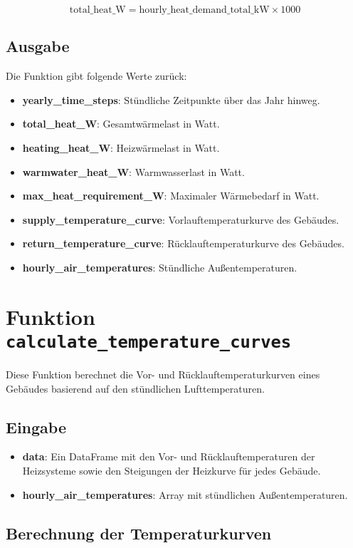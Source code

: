 \documentclass[a4paper,12pt]{article}
\begin{document}
\[
\text{total\_heat\_W} = \text{hourly\_heat\_demand\_total\_kW} \times 1000
\]

\subsection{Ausgabe}
Die Funktion gibt folgende Werte zurück:
\begin{itemize}
    \item \textbf{yearly\_time\_steps}: Stündliche Zeitpunkte über das Jahr hinweg.
    \item \textbf{total\_heat\_W}: Gesamtwärmelast in Watt.
    \item \textbf{heating\_heat\_W}: Heizwärmelast in Watt.
    \item \textbf{warmwater\_heat\_W}: Warmwasserlast in Watt.
    \item \textbf{max\_heat\_requirement\_W}: Maximaler Wärmebedarf in Watt.
    \item \textbf{supply\_temperature\_curve}: Vorlauftemperaturkurve des Gebäudes.
    \item \textbf{return\_temperature\_curve}: Rücklauftemperaturkurve des Gebäudes.
    \item \textbf{hourly\_air\_temperatures}: Stündliche Außentemperaturen.
\end{itemize}

\section{Funktion \texttt{calculate\_temperature\_curves}}

Diese Funktion berechnet die Vor- und Rücklauftemperaturkurven eines Gebäudes basierend auf den stündlichen Lufttemperaturen.

\subsection{Eingabe}
\begin{itemize}
    \item \textbf{data}: Ein DataFrame mit den Vor- und Rücklauftemperaturen der Heizsysteme sowie den Steigungen der Heizkurve für jedes Gebäude.
    \item \textbf{hourly\_air\_temperatures}: Array mit stündlichen Außentemperaturen.
\end{itemize}

\subsection{Berechnung der Temperaturkurven}
\end{document}
